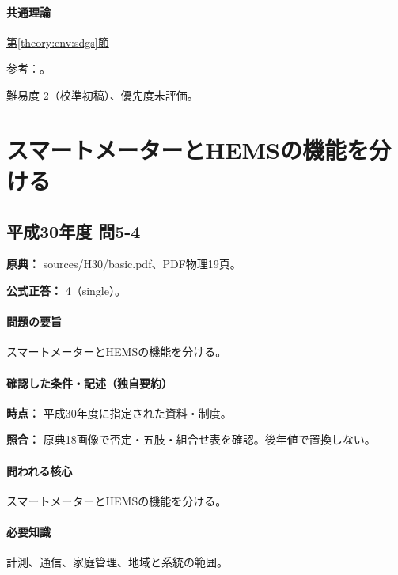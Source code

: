 \paragraph{共通理論} \hyperref[theory:env:sdgs]{第\ref*{theory:env:sdgs}節}

\par 参考：\cite{env_sdgs_un,env_sdgs2016}。

\par 難易度 2（校準初稿）、優先度未評価。

\section{スマートメーターとHEMSの機能を分ける}

\subsection{平成30年度 問5-4}
\label{q:h30-reg-basic-5-4}

\noindent\textbf{原典：} sources/H30/basic.pdf、PDF物理19頁。

\textbf{公式正答：} 4（single）。

\paragraph{問題の要旨} スマートメーターとHEMSの機能を分ける。

\paragraph{確認した条件・記述（独自要約）}\mbox{}\par

\noindent\textbf{時点：} 平成30年度に指定された資料・制度。\par

\noindent\textbf{照合：} 原典18画像で否定・五肢・組合せ表を確認。後年値で置換しない。\par

\paragraph{問われる核心} スマートメーターとHEMSの機能を分ける。

\paragraph{必要知識} 計測、通信、家庭管理、地域と系統の範囲。

